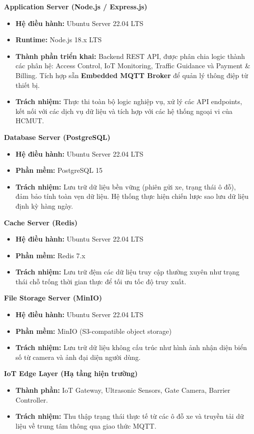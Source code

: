 \textbf{Application Server (Node.js / Express.js)} 
\begin{itemize}
    \item \textbf{Hệ điều hành:} Ubuntu Server 22.04 LTS
    \item \textbf{Runtime:} Node.js 18.x LTS
    \item \textbf{Thành phần triển khai:} Backend REST API, được phân chia logic thành các phân hệ: Access Control, IoT Monitoring, Traffic Guidance và Payment \& Billing. Tích hợp sẵn \textbf{Embedded MQTT Broker} để quản lý thông điệp từ thiết bị.
    \item \textbf{Trách nhiệm:} Thực thi toàn bộ logic nghiệp vụ, xử lý các API endpoints, kết nối với các dịch vụ dữ liệu và tích hợp với các hệ thống ngoại vi của HCMUT.
\end{itemize}

\textbf{Database Server (PostgreSQL)} 
\begin{itemize}
    \item \textbf{Hệ điều hành:} Ubuntu Server 22.04 LTS
    \item \textbf{Phần mềm:} PostgreSQL 15
    \item \textbf{Trách nhiệm:} Lưu trữ dữ liệu bền vững (phiên gửi xe, trạng thái ô đỗ), đảm bảo tính toàn vẹn dữ liệu. Hệ thống thực hiện chiến lược sao lưu dữ liệu định kỳ hàng ngày.
\end{itemize}

\textbf{Cache Server (Redis)} 
\begin{itemize}
    \item \textbf{Hệ điều hành:} Ubuntu Server 22.04 LTS
    \item \textbf{Phần mềm:} Redis 7.x
    \item \textbf{Trách nhiệm:} Lưu trữ đệm các dữ liệu truy cập thường xuyên như trạng thái chỗ trống thời gian thực để tối ưu tốc độ truy xuất.
\end{itemize}

\textbf{File Storage Server (MinIO)} 
\begin{itemize}
    \item \textbf{Hệ điều hành:} Ubuntu Server 22.04 LTS
    \item \textbf{Phần mềm:} MinIO (S3-compatible object storage)
    \item \textbf{Trách nhiệm:} Lưu trữ dữ liệu không cấu trúc như hình ảnh nhận diện biển số từ camera và ảnh đại diện người dùng.
\end{itemize}

\textbf{IoT Edge Layer (Hạ tầng hiện trường)} 
\begin{itemize}
    \item \textbf{Thành phần:} IoT Gateway, Ultrasonic Sensors, Gate Camera, Barrier Controller.
    \item \textbf{Trách nhiệm:} Thu thập trạng thái thực tế từ các ô đỗ xe và truyền tải dữ liệu về trung tâm thông qua giao thức MQTT.
\end{itemize}

